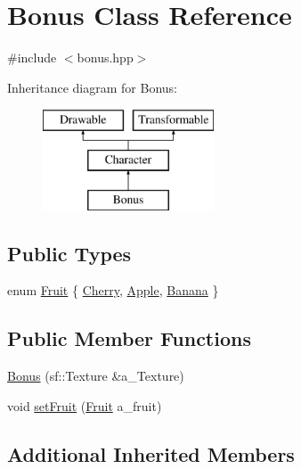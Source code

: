 \hypertarget{class_bonus}{}\section{Bonus Class Reference}
\label{class_bonus}


{\ttfamily \#include $<$bonus.\+hpp$>$}

Inheritance diagram for Bonus\+:\begin{figure}[H]
\begin{center}
\leavevmode
\includegraphics[height=3.000000cm]{class_bonus}
\end{center}
\end{figure}
\subsection*{Public Types}
\begin{DoxyCompactItemize}
\item 
enum \hyperlink{class_bonus_a4325b797efccdaec4e373ceabbfc997f}{Fruit} \{ \hyperlink{class_bonus_a4325b797efccdaec4e373ceabbfc997fa8bce8befd77d72990f2f3f29b949e5aa}{Cherry}, 
\hyperlink{class_bonus_a4325b797efccdaec4e373ceabbfc997fa45dcc835f1401a33b977acb3d2a328cb}{Apple}, 
\hyperlink{class_bonus_a4325b797efccdaec4e373ceabbfc997fad1fd5f77c455ee8d92a95510e32d83fc}{Banana}
 \}
\end{DoxyCompactItemize}
\subsection*{Public Member Functions}
\begin{DoxyCompactItemize}
\item 
\hyperlink{class_bonus_a46346c2f358e8671fc3d4a3c7fae87de}{Bonus} (sf\+::\+Texture \&a\+\_\+\+Texture)
\item 
void \hyperlink{class_bonus_ad6b1650c30b01857ef003a6e9ebf4265}{set\+Fruit} (\hyperlink{class_bonus_a4325b797efccdaec4e373ceabbfc997f}{Fruit} a\+\_\+fruit)
\end{DoxyCompactItemize}
\subsection*{Additional Inherited Members}


